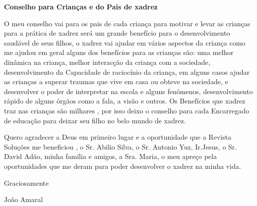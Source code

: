 \begin{multicols}{2}
\textbf{Conselho para Crianças e do Pais de xadrez}
 
O meu conselho vai para os pais de cada criança para motivar e levar as crianças para a prática de xadrez será um grande benefício para o desenvolvimento saudável de seus filhos, o xadrez vai ajudar em vários aspectos da criança como me ajudou em geral alguns dos benefícios para as crianças são: uma melhor dinâmica na criança, melhor interacção da criança com a sociedade, desenvolvimento da Capacidade de raciocínio da criança, em alguns casos ajudar as crianças a superar  traumas que vive em casa ou obteve na sociedade, e desenvolver o poder de interpretar na escola e alguns fenómenos, desenvolvimento rápido de  alguns órgãos como a fala, a visão e outros. Os Benefícios que xadrez traz nas crianças são milhares , por isso deixo o conselho para cada Encarregado de educação para deixar seu filho no belo mundo de xadrez.

Quero agradecer a Deus em primeiro lugar e a oportunidade que a Revista Soluções me beneficiou , o Sr. Abilio Silva, o Sr. Antonio Yuz, Ir.Jesus, o Sr. David Adão, minha família e amigos, a Sra. Maria, o meu apreço pela oportunidades que me deram para poder desenvolver o xadrez na minha  vida.

Graciosamente 

    João Amaral

\end{multicols}
